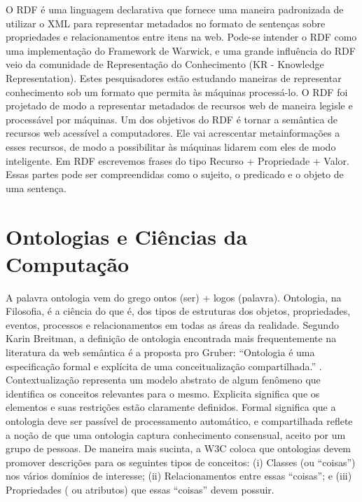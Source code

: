 O RDF é uma linguagem declarativa que fornece uma maneira padronizada de utilizar o XML para representar metadados no formato de sentenças sobre propriedades e relacionamentos entre itens na web. Pode-se intender o RDF como uma implementação do Framework  de Warwick, e uma grande influência do RDF veio da comunidade de Representação do Conhecimento (KR - Knowledge Representation). Estes pesquisadores estão estudando maneiras de representar conhecimento sob um formato que permita às máquinas processá-lo. O RDF foi projetado de modo a representar metadados de recursos web de maneira legisle e processável por máquinas.  Um dos objetivos do RDF é tornar a semântica de recursos web acessível a computadores. Ele vai acrescentar metainformações a esses recursos, de modo a possibilitar às máquinas lidarem com eles de modo inteligente. Em RDF escrevemos frases do tipo Recurso + Propriedade + Valor. Essas partes pode ser compreendidas como o sujeito, o predicado e o objeto de uma sentença.

\section{Ontologias e Ciências da Computação}

A palavra ontologia vem do grego ontos (ser) + logos (palavra). Ontologia, na Filosofia, é a ciência do que é, dos tipos de estruturas dos objetos, propriedades, eventos, processos e relacionamentos em todas as áreas da realidade. Segundo Karin Breitman, a definição de ontologia encontrada mais frequentemente na literatura da web semântica é a proposta pro Gruber: “Ontologia é uma especificação formal e explícita de uma conceitualização compartilhada.” . Contextualização representa um modelo abstrato de algum fenômeno que identifica os conceitos relevantes para o mesmo. Explicita significa que os elementos e suas restrições estão claramente definidos. Formal significa que a ontologia deve ser passível de processamento automático, e compartilhada reflete a noção de que uma ontologia captura conhecimento consensual, aceito por um grupo de pessoas. De maneira mais sucinta, a W3C coloca que ontologias devem promover descrições para os seguintes tipos de conceitos: (i) Classes (ou “coisas”) nos vários domínios de interesse; (ii) Relacionamentos entre essas “coisas”; e (iii) Propriedades ( ou atributos) que essas “coisas” devem possuir. 